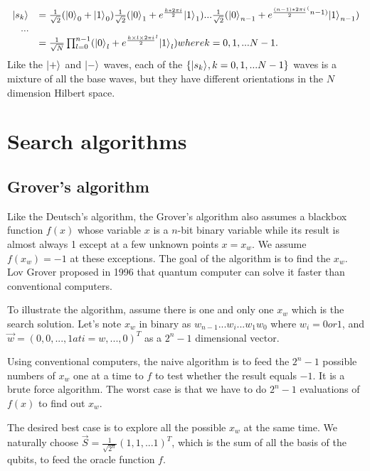 \documentclass{ctexbook}
\begin{document}
\begin{equation}
\begin{array}{rl}
\vert {s_k} \rangle_{} &= \frac 1 {\sqrt{2}} ({\vert {0} \rangle_{}}_0+{\vert {1} \rangle_{}}_0)
    \frac 1 {\sqrt{2}} ({\vert {0} \rangle_{}}_1+e^{\frac {k*2 \pi i} 2}{\vert {1} \rangle_{}}_1)
    ...  \frac 1 {\sqrt{2}} ({\vert {0} \rangle_{}}_{n-1}+e^{\frac {(n-1)*2\pi i} 2^(n-1)}{\vert {1} \rangle_{}}_{n-1}) \\
    ... \\
    &= \frac 1 {\sqrt{N}} \prod^{n-1}_{l=0} ({\vert {0} \rangle_{}}_l+e^{\frac {k\times l \times 2\pi i} 2^l}{\vert {1} \rangle_{}}_l) where k=0, 1, ...N-1.
\end{array}
\end{equation}
Like the $\vert {+} \rangle_{}$ and $\vert {-} \rangle_{}$ waves, each of the $\{\vert {s_k} \rangle_{}, k=0, 1, ... N-1\}$ waves is a mixture of all the base waves, but they have different orientations in the $N$ dimension Hilbert space.


\chapter{Search algorithms}
\section{Grover's algorithm}
Like the Deutsch's algorithm, the Grover's algorithm also assumes a blackbox function $f(x)$ whose variable $x$ is a $n$-bit binary variable while its result is almost always 1 except at a few unknown points $x=x_w$. We assume $f(x_w)=-1$ at these exceptions. The goal of the algorithm is to find the $x_w$. Lov Grover proposed in 1996 that quantum computer can solve it faster than conventional computers.

To illustrate the algorithm, assume there is one and only one $x_w$ which is the search solution. Let's note $x_w$ in binary as $w_{n-1}...w_i...w_1 w_0$ where $w_i = 0 or 1$,
and $\Vec{w} = (0, 0, ..., 1 at i=w, ..., 0)^T$ as a $2^n-1$ dimensional vector.

Using conventional computers, the naive algorithm is to feed the $2^n -1$ possible numbers of $x_w$ one at a time to $f$ to test whether the result equals $-1$. It is a brute force algorithm. The worst case is that we have to do $2^n-1$ evaluations of $f(x)$ to find out $x_w$.

The desired best case is to explore all the possible $x_w$ at the same time. We naturally choose $\vec{S} = \frac 1 {\sqrt{2^n}} (1, 1, ...1)^T$, which is the sum of all the basis of the qubits, to feed the oracle function $f$.
\end{document}
